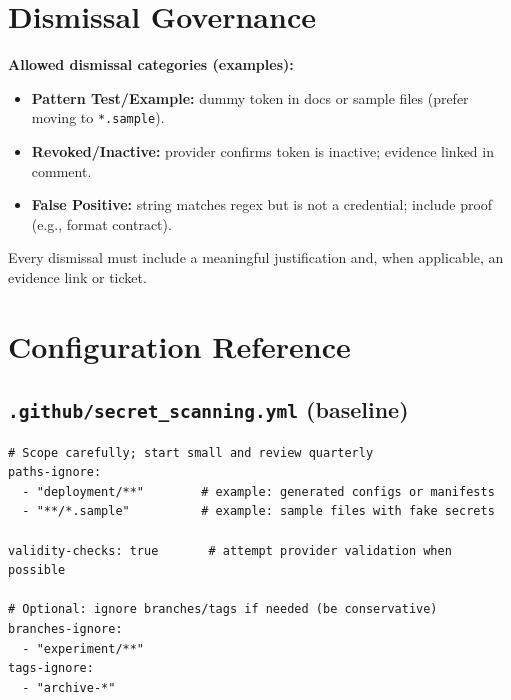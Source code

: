 \documentclass[11pt,a4paper,oneside,notitlepage]{article}
\begin{document}
\section{Dismissal Governance}\label{sec:dismissal}
\begin{tcolorbox}
\textbf{Allowed dismissal categories (examples):}
\begin{itemize}
  \item \textbf{Pattern Test/Example:} dummy token in docs or sample files (prefer moving to \texttt{*.sample}).
  \item \textbf{Revoked/Inactive:} provider confirms token is inactive; evidence linked in comment.
  \item \textbf{False Positive:} string matches regex but is not a credential; include proof (e.g., format contract).
\end{itemize}
\end{tcolorbox}
\noindent
Every dismissal must include a meaningful justification and, when applicable, an evidence link or ticket.

\section{Configuration Reference}
\subsection{\texttt{.github/secret\_scanning.yml} (baseline)}
\begin{listing}[h]
\caption{\texttt{.github/secret\_scanning.yml} baseline}\label{lst:secret-yaml}
\begin{verbatim}
# Scope carefully; start small and review quarterly
paths-ignore:
  - "deployment/**"        # example: generated configs or manifests
  - "**/*.sample"          # example: sample files with fake secrets

validity-checks: true       # attempt provider validation when possible

# Optional: ignore branches/tags if needed (be conservative)
branches-ignore:
  - "experiment/**"
tags-ignore:
  - "archive-*"
\end{verbatim}
\end{listing}
\end{document}
